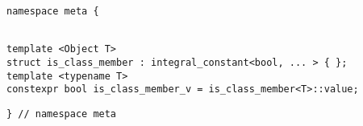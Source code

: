 
\begin{verbatim}
namespace meta {
\end{verbatim}
\begin{verbatim}

template <Object T>
struct is_class_member : integral_constant<bool, ... > { };
template <typename T>
constexpr bool is_class_member_v = is_class_member<T>::value;

\end{verbatim}
\begin{verbatim}
} // namespace meta
\end{verbatim}
